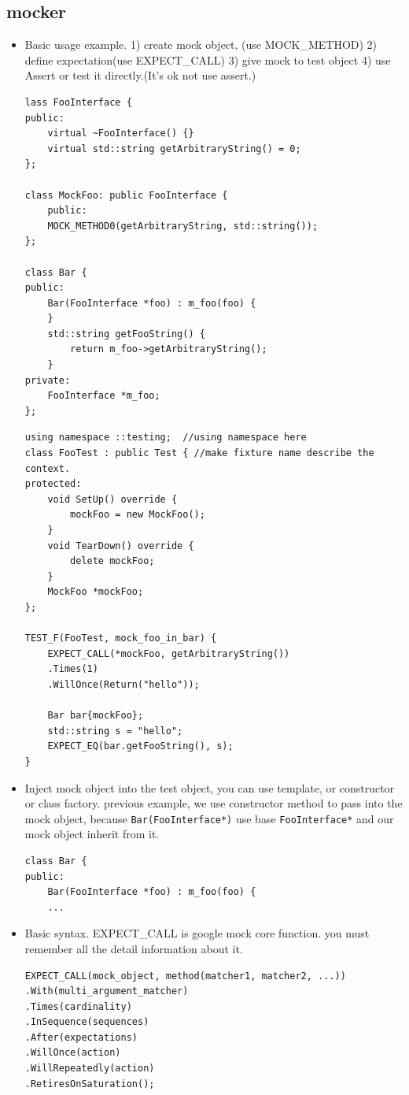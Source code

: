 \documentclass[a4paper,11pt,twoside]{book}
\begin{document}
\subsection{mocker}
\begin{itemize}
	\item Basic usage example. 1) create mock object, (use MOCK\_METHOD) 2) define expectation(use EXPECT\_CALL) 3) give mock to test object 4) use Assert or test it directly.(It's ok not use assert.)
	
\begin{lstlisting}
lass FooInterface {
public:
	virtual ~FooInterface() {}
	virtual std::string getArbitraryString() = 0;
};

class MockFoo: public FooInterface {
	public:
	MOCK_METHOD0(getArbitraryString, std::string());
};

class Bar {
public:
	Bar(FooInterface *foo) : m_foo(foo) {
	}	
	std::string getFooString() {
		return m_foo->getArbitraryString();
	}	
private:
	FooInterface *m_foo;
};
\end{lstlisting}

\begin{lstlisting}
using namespace ::testing;  //using namespace here
class FooTest : public Test { //make fixture name describe the context.
protected:
	void SetUp() override {
		mockFoo = new MockFoo();
	}
	void TearDown() override {
		delete mockFoo;     
	}
	MockFoo *mockFoo;
};

TEST_F(FooTest, mock_foo_in_bar) {	
	EXPECT_CALL(*mockFoo, getArbitraryString())
	.Times(1)
	.WillOnce(Return("hello"));
	
	Bar bar{mockFoo};
	std::string s = "hello";
	EXPECT_EQ(bar.getFooString(), s);
}
\end{lstlisting}

	\item Inject mock object into the test object, you can use template, or constructor or class factory.  previous example, we use constructor method to pass into the mock object, because \texttt{Bar(FooInterface*)} use base \texttt{FooInterface*} and our mock object inherit from it. 
\begin{lstlisting}
class Bar {
public:
	Bar(FooInterface *foo) : m_foo(foo) {	
	...
\end{lstlisting}
	
	
	\item Basic syntax. EXPECT\_CALL is google mock core function. you must remember all the detail information about it.
\begin{lstlisting}
EXPECT_CALL(mock_object, method(matcher1, matcher2, ...))
.With(multi_argument_matcher)
.Times(cardinality)
.InSequence(sequences)
.After(expectations)
.WillOnce(action)
.WillRepeatedly(action)
.RetiresOnSaturation();	
\end{lstlisting}
	

\end{itemize}
\end{document}
